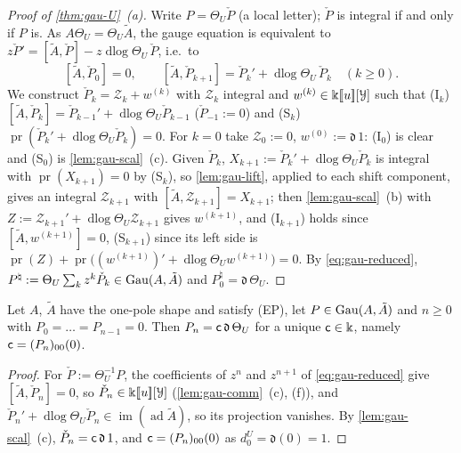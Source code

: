 
\begin{proof}[Proof of \cref{thm:gau-U}~(a)]
Write $P=\Theta_U\check P$ (a local letter); $\check P$ is integral if and only if $P$ is. As $A\Theta_U=\Theta_U\tilde A$, the gauge equation is equivalent to $z\check P'=[\tilde A,\check P]-z\operatorname{dlog}\Theta_U\,\check P$, i.e.\ to
\begin{equation}
\label{eq:gau-reduced}
[\tilde A,\check P_0]=0,\qquad [\tilde A,\check P_{k+1}]=\check P_k'+\operatorname{dlog}\Theta_U\,\check P_k\quad(k\geq0).
\end{equation}
We construct $\check P_k=\mathcal Z_k+w^{(k)}$ with $\mathcal Z_k$ integral and $w^{(k)}\in\Bbbk[\![ u ]\!][\mathcal Y]$ such that (I$_k$) $[\tilde A,\check P_k]=\check P_{k-1}'+\operatorname{dlog}\Theta_U\check P_{k-1}$ ($\check P_{-1}:=0$) and (S$_k$) $\operatorname{pr}(\check P_k'+\operatorname{dlog}\Theta_U\check P_k)=0$. For $k=0$ take $\mathcal Z_0:=0$, $w^{(0)}:=\mathfrak d\,1$: (I$_0$) is clear and (S$_0$) is \cref{lem:gau-scal}~(c). Given $\check P_k$, $X_{k+1}:=\check P_k'+\operatorname{dlog}\Theta_U\check P_k$ is integral with $\operatorname{pr}(X_{k+1})=0$ by (S$_k$), so \cref{lem:gau-lift}, applied to each shift component, gives an integral $\mathcal Z_{k+1}$ with $[\tilde A,\mathcal Z_{k+1}]=X_{k+1}$; then \cref{lem:gau-scal}~(b) with $Z:=\mathcal Z_{k+1}'+\operatorname{dlog}\Theta_U\mathcal Z_{k+1}$ gives $w^{(k+1)}$, and (I$_{k+1}$) holds since $[\tilde A,w^{(k+1)}]=0$, (S$_{k+1}$) since its left side is $\operatorname{pr}(Z)+\operatorname{pr}\bigl((w^{(k+1)})'+\operatorname{dlog}\Theta_Uw^{(k+1)}\bigr)=0$. By \eqref{eq:gau-reduced}, $P^\natural:=\Theta_U\sum_kz^k\check P_k\in\operatorname{Gau}(A,\tilde A)$ and $P^\natural_0=\mathfrak d\,\Theta_U$.
\end{proof}

\begin{lem}
\label{lem:gau-lead}
Let $A$, $\tilde A$ have the one-pole shape and satisfy (EP), let $P\in\operatorname{Gau}(A,\tilde A)$ and $n\geq0$ with $P_0=\dots=P_{n-1}=0$. Then $P_n=\mathsf{c}\,\mathfrak d\,\Theta_U$ for a unique $\mathsf{c}\in\Bbbk$, namely $\mathsf{c}=(P_n)_{00}(0)$.
\end{lem}

\begin{proof}
For $\check P:=\Theta_U^{-1}P$, the coefficients of $z^n$ and $z^{n+1}$ of \eqref{eq:gau-reduced} give $[\tilde A,\check P_n]=0$, so $\check P_n\in\Bbbk[\![ u ]\!][\mathcal Y]$ (\cref{lem:gau-comm}~(c), (f)), and $\check P_n'+\operatorname{dlog}\Theta_U\check P_n\in\operatorname{im}(\operatorname{ad}\tilde A)$, so its projection vanishes. By \cref{lem:gau-scal}~(c), $\check P_n=\mathsf{c}\,\mathfrak d\,1$, and $\mathsf{c}=(P_n)_{00}(0)$ as $d^U_0=\mathfrak d(0)=1$.
\end{proof}

